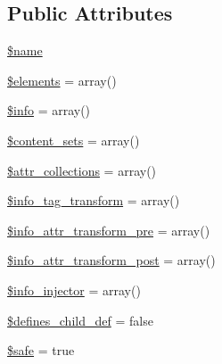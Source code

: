 \subsection*{Public Attributes}
\begin{DoxyCompactItemize}
\item 
\hyperlink{classHTMLPurifier__HTMLModule_a10f7d43e478f76541c170593453b9e50}{\$name}
\item 
\hyperlink{classHTMLPurifier__HTMLModule_a55ba2bf877759995be201f4badb49fc8}{\$elements} = array()
\item 
\hyperlink{classHTMLPurifier__HTMLModule_a8993a9639004f7e706f63f65ee28254f}{\$info} = array()
\item 
\hyperlink{classHTMLPurifier__HTMLModule_a9ab9ca2173f38bb33d398db756714809}{\$content\+\_\+sets} = array()
\item 
\hyperlink{classHTMLPurifier__HTMLModule_a7c8805952fcf0ad143180d97b3d3ec17}{\$attr\+\_\+collections} = array()
\item 
\hyperlink{classHTMLPurifier__HTMLModule_a9cd963895282a192b432ebef787fe93b}{\$info\+\_\+tag\+\_\+transform} = array()
\item 
\hyperlink{classHTMLPurifier__HTMLModule_a8360302f80672ee91e38609982ee3e96}{\$info\+\_\+attr\+\_\+transform\+\_\+pre} = array()
\item 
\hyperlink{classHTMLPurifier__HTMLModule_aef22ceb521086ceea23c408cd4974c40}{\$info\+\_\+attr\+\_\+transform\+\_\+post} = array()
\item 
\hyperlink{classHTMLPurifier__HTMLModule_a68a3f58ec05cf9b1aceb0ee0966dc4fa}{\$info\+\_\+injector} = array()
\item 
\hyperlink{classHTMLPurifier__HTMLModule_a6a249c0e393231a3c59d9b1f8ec897f0}{\$defines\+\_\+child\+\_\+def} = false
\item 
\hyperlink{classHTMLPurifier__HTMLModule_a2607fc85f803afa801cf1904300644b9}{\$safe} = true
\end{DoxyCompactItemize}


